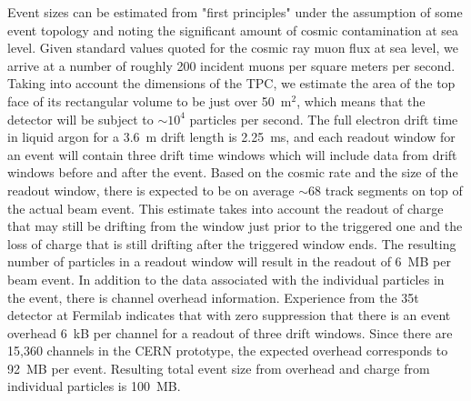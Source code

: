 Event sizes can be estimated from "first principles" under the assumption of some event topology and noting the significant amount of cosmic contamination at sea level.  Given standard values quoted for the cosmic ray muon flux at sea level, we arrive at a number of roughly 200 incident muons per square meters per second.  Taking into account the dimensions of the TPC, we estimate the area of the top face of its rectangular volume to be just over 50~m$^{2}$, which means that the detector will be subject to $\sim10^{4}$ particles per second.  The full electron drift time in liquid argon for a 3.6~m drift length is 2.25~ms, and each readout window for an event will contain three drift time windows which will include data from drift windows before and after the event.  Based on the cosmic rate and the size of the readout window, there is expected to be on average $\sim$68 track segments on top of the actual beam event. This estimate takes into account the readout of charge that may still be drifting from the window just prior to the triggered one and the loss of charge that is still drifting after the triggered window ends.  The resulting number of particles in a readout window will result in the readout of 6~MB per beam event.  
In addition to the data associated with the individual particles in the event, there is channel overhead information.   Experience from the 35t detector at Fermilab indicates that with zero suppression that there is an event overhead 6~kB per channel for a readout of three drift windows.
%
%
Since there are 15,360 channels in the CERN prototype, the expected overhead corresponds to 92~MB per event.  Resulting total event size from overhead and charge from individual particles is 100~MB. 



